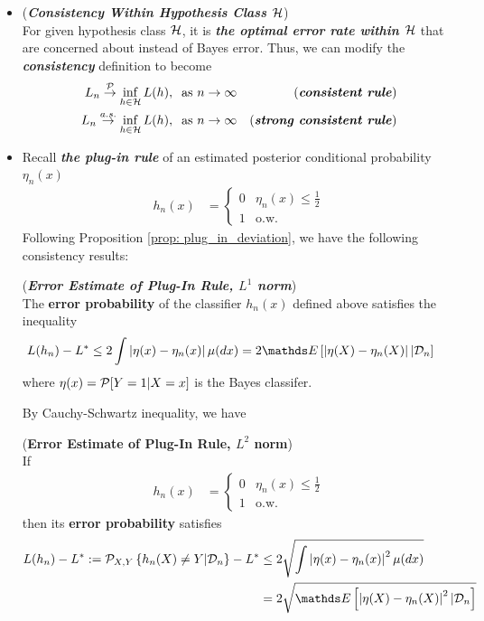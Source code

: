 \documentclass[11pt]{article}
\begin{document}
\begin{itemize}
\item \begin{remark} (\textbf{\emph{Consistency Within Hypothesis Class ${\mathcal H}$}}) \\
For given hypothesis class ${\mathcal H}$, it is  \emph{\textbf{the optimal error rate within ${\mathcal H}$}} that are concerned about  instead of Bayes error. Thus, we can modify the \emph{\textbf{consistency}} definition to become
\begin{align*}
L_n  \stackrel{{\mathcal P}}{\rightarrow} \inf_{h \in {\mathcal H}}L(h),\;\; \text{as } n\rightarrow \infty && \text{(\emph{\textbf{consistent rule}})}\\
L_n  \stackrel{a.s.}{\rightarrow} \inf_{h \in {\mathcal H}}L(h),\;\; \text{as } n\rightarrow \infty && \text{(\emph{\textbf{strong consistent rule}})}
\end{align*}
\end{remark}

\item Recall \emph{\textbf{the plug-in rule}} of an estimated posterior conditional probability $\eta_n(x)$
\begin{align*}
h_n(x) &= \left\{ \begin{array}{cc}
0 & \eta_n(x) \le \frac{1}{2}\\
1 & \text{o.w.}
\end{array}
\right.
\end{align*} Following Proposition \ref{prop: plug_in_deviation}, we have the following consistency results:
\begin{remark} (\textbf{\emph{Error Estimate of Plug-In Rule, $L^1$ norm}}) \citep{devroye2013probabilistic} \\
The \textbf{error probability} of the classifier $h_n(x)$ defined above satisfies the inequality
\begin{align*}
L(h_n) - L^{*} &\le 2 \int \abs{\eta(x) - \eta_n(x)} \mu(dx) =2 \E{}{\abs{\eta(X) - \eta_n(X)}| \cD_n} \
\end{align*} where $\eta(x) = {\mathcal P}[Y =  1| X=x]$ is the Bayes classifer.
\end{remark}

By Cauchy-Schwartz inequality, we have
\begin{corollary}(\textbf{Error Estimate of Plug-In Rule, $L^2$ norm}) \citep{devroye2013probabilistic} \\
If \begin{align*}
h_n(x) &= \left\{ \begin{array}{cc}
0 & \eta_n(x) \le \frac{1}{2}\\
1 & \text{o.w.}
\end{array}
\right.
\end{align*} then its \textbf{error probability} satisfies
\begin{align}
L(h_n) - L^{*}:= \cP_{X,Y}\set{h_n(X) \neq Y | \cD_n} - L^{*} &\le 2 \sqrt{\int \abs{\eta(x) - \eta_n(x)}^2 \mu(dx)} \nonumber\\
&=2\sqrt{\E{}{\abs{\eta(X) - \eta_n(X)}^2 | \cD_n}} \label{eqn: plug_in_error_estimate_l1}
\end{align}
\end{corollary}


\end{itemize}
\end{document}
